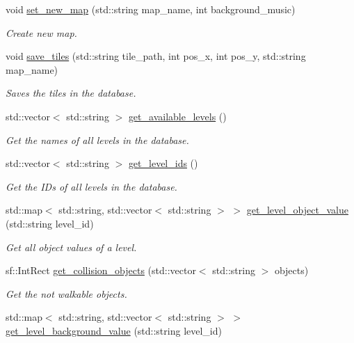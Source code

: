 \begin{DoxyCompactItemize}
void \hyperlink{classsql_ac24a3682f7478f78508e3e433b637407}{set\+\_\+new\+\_\+map} (std\+::string map\+\_\+name, int background\+\_\+music)
\begin{DoxyCompactList}\small\item\em Create new map. \end{DoxyCompactList}\item 
void \hyperlink{classsql_a4c6195e2934d72569b45041039a2be63}{save\+\_\+tiles} (std\+::string tile\+\_\+path, int pos\+\_\+x, int pos\+\_\+y, std\+::string map\+\_\+name)
\begin{DoxyCompactList}\small\item\em Saves the tiles in the database. \end{DoxyCompactList}\item 
std\+::vector$<$ std\+::string $>$ \hyperlink{classsql_a29fe43df701460704744049aec28d58e}{get\+\_\+available\+\_\+levels} ()
\begin{DoxyCompactList}\small\item\em Get the names of all levels in the database. \end{DoxyCompactList}\item 
std\+::vector$<$ std\+::string $>$ \hyperlink{classsql_a9928c456c632f88d19cce26b8165bd6f}{get\+\_\+level\+\_\+ids} ()
\begin{DoxyCompactList}\small\item\em Get the ID\textquotesingle{}s of all levels in the database. \end{DoxyCompactList}\item 
std\+::map$<$ std\+::string, std\+::vector$<$ std\+::string $>$ $>$ \hyperlink{classsql_a1dd21fbf729e949d804ba5509af2b295}{get\+\_\+level\+\_\+object\+\_\+value} (std\+::string level\+\_\+id)
\begin{DoxyCompactList}\small\item\em Get all object values of a level. \end{DoxyCompactList}\item 
sf\+::\+Int\+Rect \hyperlink{classsql_af126860a2afcf82e53c9f895577bab76}{get\+\_\+collision\+\_\+objects} (std\+::vector$<$ std\+::string $>$ objects)
\begin{DoxyCompactList}\small\item\em Get the not walkable objects. \end{DoxyCompactList}\item 
std\+::map$<$ std\+::string, std\+::vector$<$ std\+::string $>$ $>$ \hyperlink{classsql_a5eb7fea00a56fe6ba33f602871798bc8}{get\+\_\+level\+\_\+background\+\_\+value} (std\+::string level\+\_\+id)

\end{DoxyCompactItemize}
